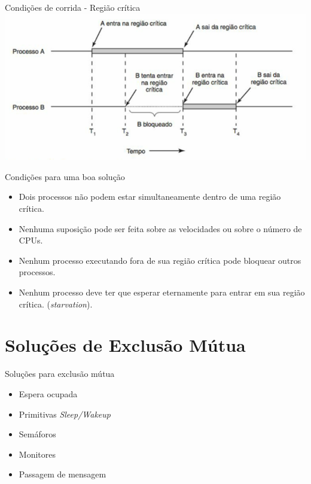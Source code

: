 \documentclass[aspectratio=169,
				xcolor=table]{beamer}
\begin{document}
	
	\begin{frame}{Condições de corrida - Região crítica}
		\includegraphics[keepaspectratio, height=0.75\paperheight]{../figs/cap05/regiaocritica.png}
	\end{frame}

	\begin{frame}{Condições para uma boa solução}
		\begin{itemize}
			\item Dois processos não podem estar simultaneamente dentro de uma região crítica.
			\vspace{1em}
			\item Nenhuma suposição pode ser feita sobre as velocidades ou sobre o número de CPUs.
			\vspace{1em}
			\item Nenhum processo executando fora de sua região crítica pode bloquear outros processos.
			\vspace{1em}
			\item Nenhum processo deve ter que esperar eternamente para entrar em sua região crítica. (\textit{starvation}).
		\end{itemize}	
	\end{frame}	
	
	\section{Soluções de Exclusão Mútua}
	\begin{frame}{Soluções para exclusão mútua}
		\begin{itemize}
			\item Espera ocupada
			\vspace{1em}
			\item Primitivas \textit{Sleep/Wakeup}
			\vspace{1em}
			\item Semáforos
			\vspace{1em}
			\item Monitores
			\vspace{1em}
			\item Passagem de mensagem
		\end{itemize}
	\end{frame}
	
\end{document}
